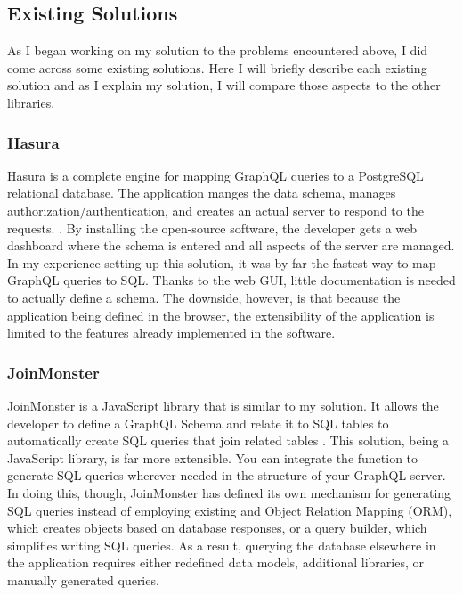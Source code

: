 \subsection{Existing Solutions}

As I began working on my solution to the problems encountered above, I did come across some existing solutions.  Here I will briefly describe each existing solution and as I explain my solution, I will compare those aspects to the other libraries.

\subsubsection{Hasura}

Hasura is a complete engine for mapping GraphQL queries to a PostgreSQL relational database. The application manges the data schema, manages authorization/authentication, and creates an actual server to respond to the requests. \cite{hasurainc.HasuraGraphQLEngine}.  By installing the open-source software, the developer gets a web dashboard where the schema is entered and all aspects of the server are managed.  In my experience setting up this solution, it was by far the fastest way to map GraphQL queries to SQL.  Thanks to the web GUI, little documentation is needed to actually define a schema.  The downside, however, is that because the application being defined in the browser, the extensibility of the application is limited to the features already implemented in the software.

\subsubsection{JoinMonster}

JoinMonster is a JavaScript library that is similar to my solution. It allows the developer to define a GraphQL Schema and relate it to SQL tables to automatically create SQL queries that join related tables \cite{carlJoinMonster}.  This solution, being a JavaScript library, is far more extensible.  You can integrate the function to generate SQL queries wherever needed in the structure of your GraphQL server.  In doing this, though, JoinMonster has defined its own mechanism for generating SQL queries instead of employing existing and Object Relation Mapping (ORM), which creates objects based on database responses, or a query builder, which simplifies writing SQL queries.  As a result, querying the database elsewhere in the application requires either redefined data models, additional libraries, or manually generated queries.